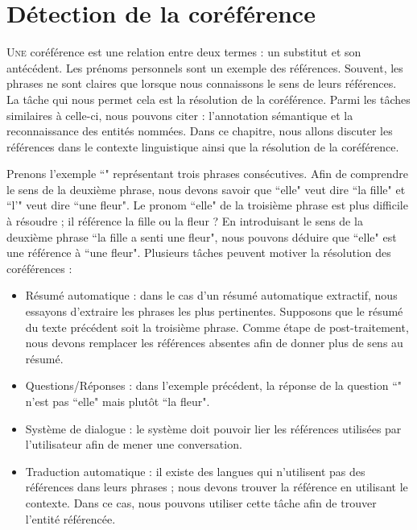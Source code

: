 \documentclass{KodeBook}
\begin{document}
		\mainmatter
	
\fi
\chapter{Détection de la coréférence}

\begin{introduction}
	\lettrine{U}{ne} coréférence est une relation entre deux termes : un substitut et son antécédent.
	Les prénoms personnels sont un exemple des références. 
	Souvent, les phrases ne sont claires que lorsque nous connaissons le sens de leurs références. 
	La tâche qui nous permet cela est la résolution de la coréférence. 
	Parmi les tâches similaires à celle-ci, nous pouvons citer : l'annotation sémantique et la reconnaissance des entités nommées. 
	Dans ce chapitre, nous allons discuter les références dans le contexte linguistique ainsi que la résolution de la coréférence.
\end{introduction} 


Prenons l'exemple ``" représentant trois phrases consécutives.
Afin de comprendre le sens de la deuxième phrase, nous devons savoir que ``elle" veut dire ``la fille" et ``l'" veut dire ``une fleur". 
Le pronom ``elle" de la troisième phrase est plus difficile à résoudre ; il référence la fille ou la fleur ?
En introduisant le sens de la deuxième phrase ``la fille a senti une fleur", nous pouvons déduire que ``elle" est une référence à ``une fleur".
Plusieurs tâches peuvent motiver la résolution des coréférences :
\begin{itemize}
	\item Résumé automatique : dans le cas d'un résumé automatique extractif, nous essayons d'extraire les phrases les plus pertinentes. 
	Supposons que le résumé du texte précédent soit la troisième phrase.
	Comme étape de post-traitement, nous devons remplacer les références absentes afin de donner plus de sens au résumé.
	\item Questions/Réponses : dans l'exemple précédent, la réponse de la question ``" n'est pas ``elle" mais plutôt ``la fleur".
	\item Système de dialogue : le système doit pouvoir lier les références utilisées par l'utilisateur afin de mener une conversation. 
	\item Traduction automatique : il existe des langues qui n'utilisent pas des références dans leurs phrases ; nous devons trouver la référence en utilisant le contexte. 
	Dans ce cas, nous pouvons utiliser cette tâche afin de trouver l'entité référencée.
\end{itemize}
\end{document}
